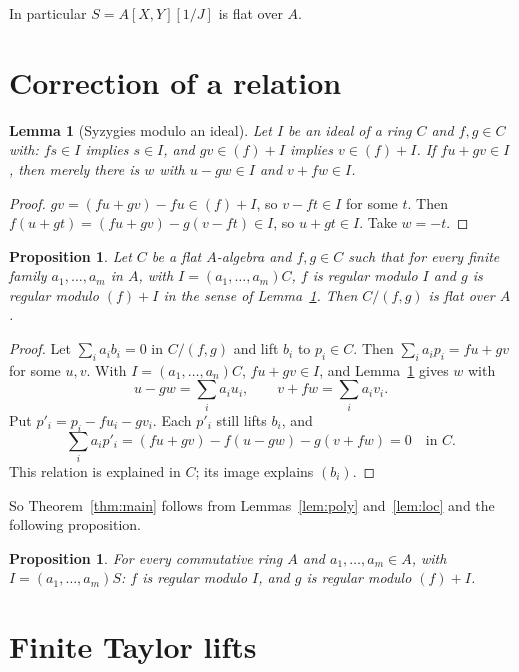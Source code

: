 \documentclass[11pt]{amsart}
\newtheorem{proposition}[theorem]{Proposition}
\newtheorem{lemma}[theorem]{Lemma}
\theoremstyle{definition}
\theoremstyle{remark}
\begin{document}
In particular $S=A[X,Y][1/J]$ is flat over $A$.

\section{Correction of a relation}

\begin{lemma}[Syzygies modulo an ideal]\label{lem:syz}
Let $I$ be an ideal of a ring $C$ and $f,g\in C$ with: $fs\in I$ implies
$s\in I$, and $gv\in(f)+I$ implies $v\in(f)+I$. If $fu+gv\in I$, then
merely there is $w$ with $u-gw\in I$ and $v+fw\in I$.
\end{lemma}

\begin{proof}
$gv=(fu+gv)-fu\in(f)+I$, so $v-ft\in I$ for some $t$. Then
$f(u+gt)=(fu+gv)-g(v-ft)\in I$, so $u+gt\in I$. Take $w=-t$.
\end{proof}

\begin{proposition}\label{prop:correction}
Let $C$ be a flat $A$-algebra and $f,g\in C$ such that for every finite
family $a_1,\dots,a_m$ in $A$, with $I=(a_1,\dots,a_m)C$, $f$ is regular
modulo $I$ and $g$ is regular modulo $(f)+I$ in the sense of
Lemma~\ref{lem:syz}. Then $C/(f,g)$ is flat over $A$.
\end{proposition}

\begin{proof}
Let $\sum_ia_ib_i=0$ in $C/(f,g)$ and lift $b_i$ to $p_i\in C$. Then
$\sum_ia_ip_i=fu+gv$ for some $u,v$. With $I=(a_1,\dots,a_n)C$,
$fu+gv\in I$, and Lemma~\ref{lem:syz} gives $w$ with
\[
 u-gw=\sum_ia_iu_i,\qquad v+fw=\sum_ia_iv_i .
\]
Put $p'_i=p_i-fu_i-gv_i$. Each $p'_i$ still lifts $b_i$, and
\[
 \sum_ia_ip'_i=(fu+gv)-f(u-gw)-g(v+fw)=0\quad\text{in }C.
\]
This relation is explained in $C$; its image explains $(b_i)$.
\end{proof}

So Theorem~\ref{thm:main} follows from Lemmas~\ref{lem:poly}
and~\ref{lem:loc} and the following proposition.

\begin{proposition}\label{prop:regular}
For every commutative ring $A$ and $a_1,\dots,a_m\in A$, with
$I=(a_1,\dots,a_m)S$: $f$ is regular modulo $I$, and $g$ is regular
modulo $(f)+I$.
\end{proposition}

\section{Finite Taylor lifts}
\end{document}
